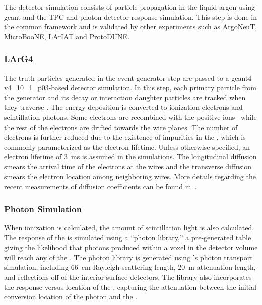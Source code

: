 The detector simulation consists of particle propagation in the liquid argon using {\sc geant} and the TPC and photon detector response simulation. This step is done in the common framework  and is validated by other  experiments such as ArgoNeuT, MicroBooNE, LArIAT and ProtoDUNE.

\subsubsection{LArG4}\label{sec:larg4}

The truth particles generated in the event generator step are passed to a {\sc geant4} v4\_10\_1\_p03-based detector simulation. In this step, each primary particle from the generator and its decay or interaction daughter particles are tracked when they traverse \lar. The energy deposition is converted to ionization electrons and scintillation photons. Some electrons are recombined with the positive ions~\cite{Acciarri:2013met,Amoruso:2004dy} while the rest of the electrons are drifted towards the wire planes. The number of electrons is further reduced due to the existence of impurities in the \lar, which is commonly parameterized as the electron lifetime. %
Unless otherwise specified, an electron
lifetime of \SI{3}{ms} is assumed in the simulations.
The longitudinal diffusion smears the arrival time of the electrons at the wires and the transverse diffusion smears the electron location among neighboring wires. More details
regarding the recent measurements of diffusion coefficients can be found
in~\cite{Li:2015rqa,larpropertiesbnl}.

\subsubsection{Photon Simulation}

When ionization is calculated, the amount of scintillation light is also calculated. The response of the  is simulated using a ``photon library,'' a pre-generated table giving the likelihood that photons produced within a voxel in the detector volume  will reach any of the . The photon library is generated using 's photon transport simulation, including \SI{66}{cm} Rayleigh scattering length, \SI{20}{m} attenuation length, and reflections off of the interior surface detectors. The library also incorporates the response versus location of the , capturing the attenuation between the initial conversion location of the photon and the .

